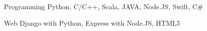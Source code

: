 


\begin{cvskills}


\cvskill
{Programming} %
{Python, C/C++, Scala, JAVA, Node.JS, Swift, C\#} %


\cvskill
{Web} %
{Django with Python, Express with Node.JS, HTML5} %



\end{cvskills}
